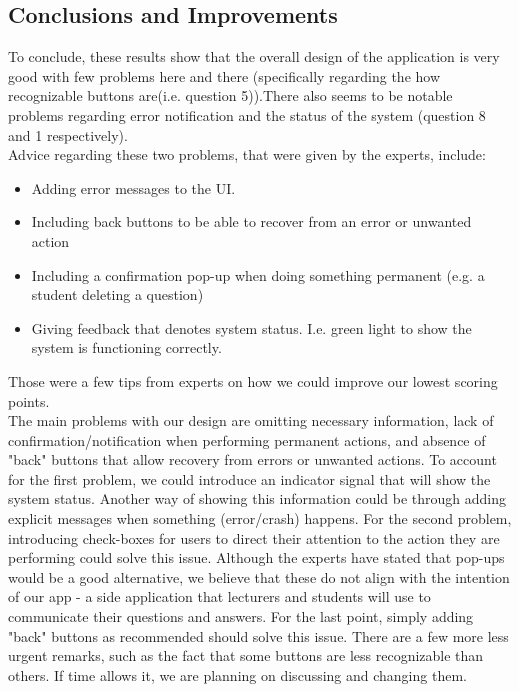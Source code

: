 \documentclass{article}
\begin{document}
\subsection{Conclusions and Improvements}
To conclude, these results show that the overall design of the application is very good with few problems here and there (specifically regarding the how recognizable buttons are(i.e. question 5)).There also seems to be notable problems regarding error notification and the status of the system (question 8 and 1 respectively).\\

Advice regarding these two problems, that were given by the experts, include:
\begin{itemize}
    \item Adding error messages to the UI.
    \item Including back buttons to be able to recover from an error or unwanted action
    \item Including a confirmation pop-up when doing something permanent (e.g. a student deleting a question)
    \item Giving feedback that denotes system status. I.e. green light to show the system is functioning correctly.
\end{itemize}

Those were a few tips from experts on how we could improve our lowest scoring points.\\

The main problems with our design are omitting necessary information, lack of confirmation/notification when performing permanent actions, and absence of "back" buttons that allow recovery from errors or unwanted actions.
To account for the first problem, we could introduce an indicator signal that will show the system status.
Another way of showing this information could be through adding explicit messages when something (error/crash) happens.
For the second problem, introducing check-boxes for users to direct their attention to the action they are performing could solve this issue.
Although the experts have stated that pop-ups would be a good alternative, we believe that these do not align with the intention of our app - a side application that lecturers and students will use to communicate their questions and answers.
For the last point, simply adding "back" buttons as recommended should solve this issue.
There are a few more less urgent remarks, such as the fact that some buttons are less recognizable than others.
If time allows it, we are planning on discussing and changing them.\\
\end{document}
